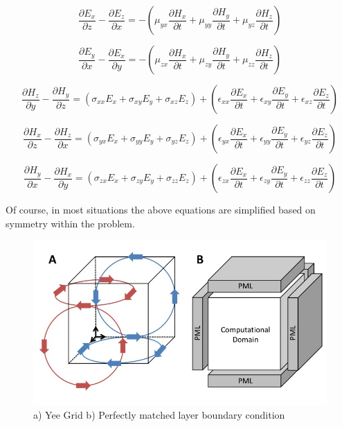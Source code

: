 \documentclass[a4paper]{article}
\begin{document}
\begin{equation}
    \frac{\partial E_x}{\partial z} - \frac{\partial E_z}{\partial x} = -\left( \mu_{yx}\frac{\partial H_x}{\partial t} + \mu_{yy}\frac{\partial H_y}{\partial t} + \mu_{yz}\frac{\partial H_z}{\partial t} \right)
\end{equation}

\begin{equation}
    \frac{\partial E_y}{\partial x} - \frac{\partial E_x}{\partial y} = -\left( \mu_{zx}\frac{\partial H_x}{\partial t} + \mu_{zy}\frac{\partial H_y}{\partial t} + \mu_{zz}\frac{\partial H_z}{\partial t} \right)
\end{equation}

\begin{equation}
    \frac{\partial H_z}{\partial y} - \frac{\partial H_y}{\partial z} = \left( \sigma_{xx} E_x +\sigma_{xy} E_y +\sigma_{xz} E_z \right) + \left( \epsilon_{xx}\frac{\partial E_x}{\partial t} + \epsilon_{xy}\frac{\partial E_y}{\partial t} + \epsilon_{xz}\frac{\partial E_z}{\partial t} \right)
\end{equation}

\begin{equation}
    \frac{\partial H_x}{\partial z} - \frac{\partial H_z}{\partial x} = \left( \sigma_{yx} E_x +\sigma_{yy} E_y +\sigma_{yz} E_z \right) + \left( \epsilon_{yx}\frac{\partial E_x}{\partial t} + \epsilon_{yy}\frac{\partial E_y}{\partial t} + \epsilon_{yz}\frac{\partial E_z}{\partial t} \right)
\end{equation}

\begin{equation}
    \frac{\partial H_y}{\partial x} - \frac{\partial H_x}{\partial y} = \left( \sigma_{zx} E_x +\sigma_{zy} E_y +\sigma_{zz} E_z \right) + \left( \epsilon_{zx}\frac{\partial E_x}{\partial t} + \epsilon_{zy}\frac{\partial E_y}{\partial t} + \epsilon_{zz}\frac{\partial E_z}{\partial t} \right)
\end{equation}

Of course, in most situations the above equations are simplified based on symmetry within the problem. 

\begin{figure}
    \centering
    \includegraphics[width=\textwidth]{./Figures/Methods_Figure.jpg}
    \caption{a) Yee Grid b) Perfectly matched layer boundary condition}
    \label{fig:YeePML}
\end{figure}
\end{document}
